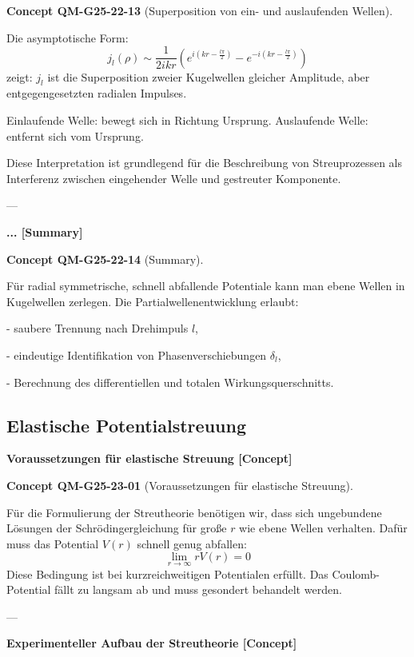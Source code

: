 \documentclass[10pt, letterpaper]{article}
\newcommand{\CustomHeading}[3]{%
  \par\medskip\noindent%
  \textbf{#1 #2} \textnormal{(#3)}.\enskip%
}
\newenvironment{CONC}[2]{\begin{unitbox}\CustomHeading{Concept}{#1}{#2}}{\end{unitbox}}
\begin{document}
\begin{CONC}{QM-G25-22-13}{Superposition von ein- und auslaufenden Wellen}
Die asymptotische Form:
\[
j_l(\rho) \sim \frac{1}{2ikr} \left( e^{i(kr - \frac{l\pi}{2})} - e^{-i(kr - \frac{l\pi}{2})} \right)
\]
zeigt: $j_l$ ist die Superposition zweier Kugelwellen gleicher Amplitude, aber entgegengesetzten radialen Impulses.

Einlaufende Welle: bewegt sich in Richtung Ursprung.  
Auslaufende Welle: entfernt sich vom Ursprung.

Diese Interpretation ist grundlegend für die Beschreibung von Streuprozessen als Interferenz zwischen eingehender Welle und gestreuter Komponente.
\end{CONC}

---

\textbf{... [Summary]}

\begin{CONC}{QM-G25-22-14}{Summary}
Für radial symmetrische, schnell abfallende Potentiale kann man ebene Wellen in Kugelwellen zerlegen. Die Partialwellenentwicklung erlaubt:

- saubere Trennung nach Drehimpuls $l$,

- eindeutige Identifikation von Phasenverschiebungen $\delta_l$,

- Berechnung des differentiellen und totalen Wirkungsquerschnitts.
\end{CONC}




\pagebreak


\subsection{Elastische Potentialstreuung}


\textbf{Voraussetzungen für elastische Streuung [Concept]}

\begin{CONC}{QM-G25-23-01}{Voraussetzungen für elastische Streuung}
Für die Formulierung der Streutheorie benötigen wir, dass sich ungebundene Lösungen der Schrödingergleichung für große $r$ wie ebene Wellen verhalten. Dafür muss das Potential $V(r)$ schnell genug abfallen:
\[
\lim_{r \to \infty} r V(r) = 0
\]
Diese Bedingung ist bei kurzreichweitigen Potentialen erfüllt. Das Coulomb-Potential fällt zu langsam ab und muss gesondert behandelt werden.
\end{CONC}

---


\textbf{Experimenteller Aufbau der Streutheorie [Concept]}
\end{document}
